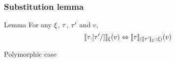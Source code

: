 \documentclass[xcolor={usenames,dvipsnames}]{beamer}
\begin{document}

\begin{frame}
  \frametitle{Substitution lemma}
  \begin{block}{Lemma}
    For any $\xi$, $\tau$, $\tau'$ and $v$,
    \[
      \lrv{\sctx}{\subst{\ty}{\ty'}{}}
      \Leftrightarrow
      \lrv{(\lrp{\sctx}{\ty'}::\sctx)}{\ty}
    \]
  \end{block}

  \begin{block}{Polymorphic case}
    \vspace{-1em}


  \end{block}

 \begin{center}
 \end{center}
\end{frame}
\end{document}
